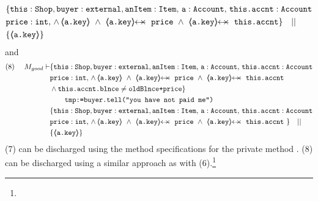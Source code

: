 \begin{proofO}
\begin{align*}
		  		& \{  \prg{this}:\prg{Shop}, \prg{buyer} : \prg{external}, \prg{anItem} : \prg{Item},\, \prg{a}:\prg{Account},\, \prg{this.accnt}:\prg{Account}\\
				& \prg{price} : \prg{int},\,
				  \wedge\, 
				  {\inside{\prg{a.key}}}\ \wedge\ 
				  \protectedFrom{\prg{a.key}}{\prg{price}}\ \wedge\ 
				   \protectedFrom{\prg{a.key}}{\prg{this.accnt}}\} \ \ \  || \ \ \ \\
		  		& \{ {\inside{\prg{a.key}}} \}
\end{align*}
\normalsize
and 
\small
\begin{align*}
\text{(8)}  \ \ \ \ M_{good} \vdash & \{  \prg{this}:\prg{Shop}, \prg{buyer} : \prg{external}, \prg{anItem} : \prg{Item},\, \prg{a}:\prg{Account},\, \prg{this.accnt}:\prg{Account}\\
				& \prg{price} : \prg{int},\,
				  \wedge\, 
				  {\inside{\prg{a.key}}}\ \wedge\ 
				  \protectedFrom{\prg{a.key}}{\prg{price}}\ \wedge\ 
				   \protectedFrom{\prg{a.key}}{\prg{this.accnt}} \\
				& \wedge \prg{this.accnt.blnce} \neq \prg{oldBlnce+price}\} \\
		  		&\SPT  \prg{tmp:=buyer.tell("you have not paid me")}\ \\  
		  		& \{  \prg{this}:\prg{Shop}, \prg{buyer} : \prg{external}, \prg{anItem} : \prg{Item},\, \prg{a}:\prg{Account},\, \prg{this.accnt}:\prg{Account}\\
				& \prg{price} : \prg{int},\,
				  \wedge\, 
				  {\inside{\prg{a.key}}}\ \wedge\ 
				  \protectedFrom{\prg{a.key}}{\prg{price}}\ \wedge\ 
				   \protectedFrom{\prg{a.key}}{\prg{this.accnt}}\ \} \ \ \  || \ \ \ \\
		  		& \{ {\inside{\prg{a.key}}} \}
\end{align*}
\normalsize
(7) can be discharged using the method specifications for the private method . (8) can be discharged using a similar approach as with (6).\footnote{}


\end{proofO}
